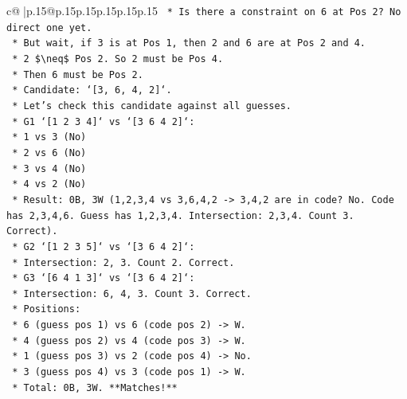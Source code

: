 \documentclass{article}
\begin{document}
{\begin{supertabular}{c@{$\;$}|p{.15\linewidth}@{}p{.15\linewidth}p{.15\linewidth}p{.15\linewidth}p{.15\linewidth}p{.15\linewidth}}
{{{\texttt{                    *   Is there a constraint on 6 at Pos 2? No direct one yet.} \\
\texttt{                    *   But wait, if 3 is at Pos 1, then 2 and 6 are at Pos 2 and 4.} \\
\texttt{                    *   2 \$\textbackslash{}neq\$ Pos 2. So 2 must be Pos 4.} \\
\texttt{                    *   Then 6 must be Pos 2.} \\
\texttt{                    *   Candidate: `{[}3, 6, 4, 2{]}`.} \\
\texttt{                    *   Let's check this candidate against all guesses.} \\
\texttt{                        *   G1 `{[}1 2 3 4{]}` vs `{[}3 6 4 2{]}`:} \\
\texttt{                            *   1 vs 3 (No)} \\
\texttt{                            *   2 vs 6 (No)} \\
\texttt{                            *   3 vs 4 (No)} \\
\texttt{                            *   4 vs 2 (No)} \\
\texttt{                            *   Result: 0B, 3W (1,2,3,4 vs 3,6,4,2 {-}> 3,4,2 are in code? No. Code has 2,3,4,6. Guess has 1,2,3,4. Intersection: 2,3,4. Count 3. Correct).} \\
\texttt{                        *   G2 `{[}1 2 3 5{]}` vs `{[}3 6 4 2{]}`:} \\
\texttt{                            *   Intersection: 2, 3. Count 2. Correct.} \\
\texttt{                        *   G3 `{[}6 4 1 3{]}` vs `{[}3 6 4 2{]}`:} \\
\texttt{                            *   Intersection: 6, 4, 3. Count 3. Correct.} \\
\texttt{                            *   Positions:} \\
\texttt{                                *   6 (guess pos 1) vs 6 (code pos 2) {-}> W.} \\
\texttt{                                *   4 (guess pos 2) vs 4 (code pos 3) {-}> W.} \\
\texttt{                                *   1 (guess pos 3) vs 2 (code pos 4) {-}> No.} \\
\texttt{                                *   3 (guess pos 4) vs 3 (code pos 1) {-}> W.} \\
\texttt{                                *   Total: 0B, 3W. **Matches!**} \\
}}}
\end{supertabular}}
\end{document}

